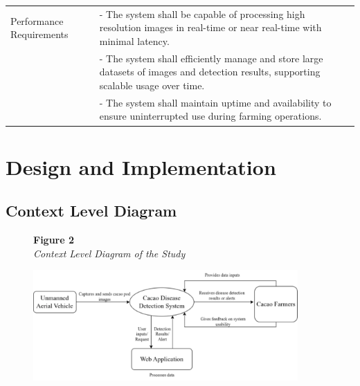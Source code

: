 \begin{longtable}{p{4cm} p{8cm}}
	Performance Requirements & - The system shall be capable of processing high resolution images in real-time or near real-time with minimal latency.                                    \\
	                         & - The system shall efficiently manage and store large datasets of images and detection results, supporting scalable usage over time.                       \\
	                         & - The system shall maintain uptime and availability to ensure uninterrupted use during farming operations.                                                 \\
\end{longtable}

\section{Design and Implementation}

\subsection{Context Level Diagram}

\begin{figure}[H]
	\raggedright
	\textbf{Figure 2} \\ %
	\textit{Context Level Diagram of the Study} %

	\vspace{0.5em}
	\centering
	\includegraphics[width=0.9\textwidth]{figures/Context_Level.pdf} %

	\vspace{0.5em}
	\raggedright

	\label{fig:context-level}
\end{figure}

